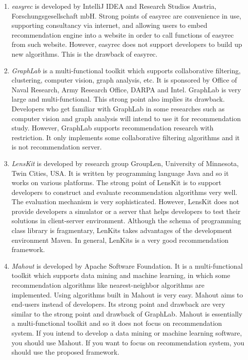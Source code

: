\documentclass[a4paper,twoside]{article}
\begin{document}
\begin{enumerate}
\item \textit{easyrec} \cite{easyrec} is developed by IntelliJ IDEA and Research Studios Austria, Forschungsgesellschaft mbH. Strong points of easyrec are convenience in use, supporting consultancy via internet, and allowing users to embed recommendation engine into a website in order to call functions of easyrec from such website. However, easyrec does not support developers to build up new algorithms. This is the drawback of easyrec.
\item \textit{GraphLab} \cite{graphlab} is a multi-functional toolkit which supports collaborative filtering, clustering, computer vision, graph analysis, etc. It is sponsored by Office of Naval Research, Army Research Office, DARPA and Intel. GraphLab is very large and multi-functional. This strong point also implies its drawback. Developers who get familiar with GraphLab in some researches such as computer vision and graph analysis will intend to use it for recommendation study. However, GraphLab supports recommendation research with restriction. It only implements some collaborative filtering algorithms and it is not recommendation server.
\item \textit{LensKit} \cite{lenskit} is developed by research group GroupLen, University of Minnesota, Twin Cities, USA. It is written by programming language Java and so it works on various platforms. The strong point of LensKit is to support developers to construct and evaluate recommendation algorithms very well. The evaluation mechanism is very sophisticated. However, LensKit does not provide developers a simulator or a server that helps developers to test their solutions in client-server environment. Although the schema of programming class library is fragmentary, LenKits takes advantages of the development environment Maven. In general, LenKits is a very good recommendation framework.
\item \textit{Mahout} \cite{mahout} is developed by Apache Software Foundation. It is a multi-functional toolkit which supports data mining and machine learning, in which some recommendation algorithms like nearest-neighbor algorithms are implemented. Using algorithms built in Mahout is very easy. Mahout aims to end-users instead of developers. Its strong point and drawback are very similar to the strong point and drawback of GraphLab. Mahout is essentially a multi-functional toolkit and so it does not focus on recommendation system. If you intend to develop a data mining or machine learning software, you should use Mahout. If you want to focus on recommendation system, you should use the proposed framework.

\end{enumerate}
\end{document}

